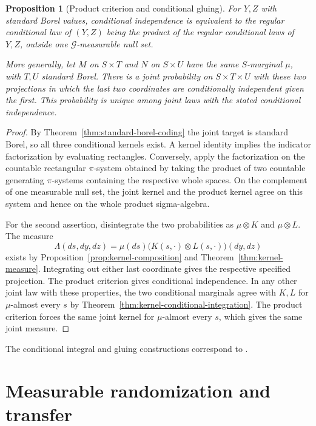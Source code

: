 \documentclass[11pt,oneside,openany]{book}
\theoremstyle{plain}
\newtheorem{proposition}[theorem]{Proposition}
\theoremstyle{definition}
\theoremstyle{remark}
\begin{document}
\begin{proposition}[Product criterion and conditional gluing]\label{prop:conditional-gluing}
For \(Y,Z\) with standard Borel values, conditional independence is equivalent to the regular conditional law of \((Y,Z)\) being the product of the regular conditional laws of \(Y,Z\), outside one \(\mathcal G\)-measurable null set.

More generally, let \(M\) on \(S\times T\) and \(N\) on \(S\times U\) have the same \(S\)-marginal \(\mu\), with \(T,U\) standard Borel. There is a joint probability on \(S\times T\times U\) with these two projections in which the last two coordinates are conditionally independent given the first. This probability is unique among joint laws with the stated conditional independence.
\end{proposition}
\begin{proof}
By Theorem~\ref{thm:standard-borel-coding} the joint target is standard Borel, so all three conditional kernels exist. A kernel identity implies the indicator factorization by evaluating rectangles. Conversely, apply the factorization on the countable rectangular \(\pi\)-system obtained by taking the product of two countable generating \(\pi\)-systems containing the respective whole spaces. On the complement of one measurable null set, the joint kernel and the product kernel agree on this system and hence on the whole product sigma-algebra.

For the second assertion, disintegrate the two probabilities as \(\mu\otimes K\) and \(\mu\otimes L\). The measure
\[
 \Lambda(ds,dy,dz)=\mu(ds)\bigl(K(s,\cdot)\otimes L(s,\cdot)\bigr)(dy,dz)
\]
exists by Proposition~\ref{prop:kernel-composition} and Theorem~\ref{thm:kernel-measure}. Integrating out either last coordinate gives the respective specified projection. The product criterion gives conditional independence. In any other joint law with these properties, the two conditional marginals agree with \(K,L\) for \(\mu\)-almost every \(s\) by Theorem~\ref{thm:kernel-conditional-integration}. The product criterion forces the same joint kernel for \(\mu\)-almost every \(s\), which gives the same joint measure.
\end{proof}

The conditional integral and gluing constructions correspond to \cite[Theorems 8.5 and 8.9 and results 8.16--8.20, pp.~168--177]{Kallenberg}.

\section{Measurable randomization and transfer}\label{p04-05}
\end{document}

